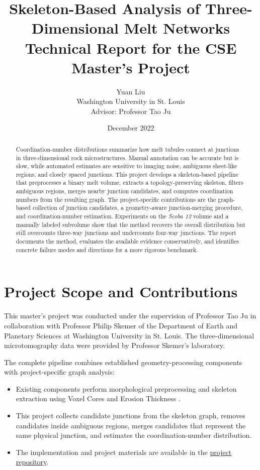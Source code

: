 \documentclass[11pt,letterpaper]{article}
\title{Skeleton-Based Analysis of Three-Dimensional Melt Networks\\
\large Technical Report for the CSE Master's Project}
\author{Yuan Liu\\
Washington University in St. Louis\\
Advisor: Professor Tao Ju}
\date{December 2022}
\newcommand{\dataset}{\textit{Scoba 12}}
\begin{document}
\maketitle

\begin{abstract}
Coordination-number distributions summarize how melt tubules connect at junctions in three-dimensional rock microstructures. Manual annotation can be accurate but is slow, while automated estimates are sensitive to imaging noise, ambiguous sheet-like regions, and closely spaced junctions. This project develops a skeleton-based pipeline that preprocesses a binary melt volume, extracts a topology-preserving skeleton, filters ambiguous regions, merges nearby junction candidates, and computes coordination numbers from the resulting graph. The project-specific contributions are the graph-based collection of junction candidates, a geometry-aware junction-merging procedure, and coordination-number estimation. Experiments on the \dataset{} volume and a manually labeled subvolume show that the method recovers the overall distribution but still overcounts three-way junctions and undercounts four-way junctions. The report documents the method, evaluates the available evidence conservatively, and identifies concrete failure modes and directions for a more rigorous benchmark.
\end{abstract}

\section{Project Scope and Contributions}

This master's project was conducted under the supervision of Professor Tao Ju in collaboration with Professor Philip Skemer of the Department of Earth and Planetary Sciences at Washington University in St. Louis. The three-dimensional microtomography data were provided by Professor Skemer's laboratory.

The complete pipeline combines established geometry-processing components with project-specific graph analysis:
\begin{itemize}
    \item Existing components perform morphological preprocessing and skeleton extraction using Voxel Cores and Erosion Thickness \cite{voxelcore,erosionthickness}.
    \item This project collects candidate junctions from the skeleton graph, removes candidates inside ambiguous regions, merges candidates that represent the same physical junction, and estimates the coordination-number distribution.
    \item The implementation and project materials are available in the \href{https://github.com/HiveYuan/Skeleton_Analysis_of_Melt_Network}{project repository}.
\end{itemize}
\end{document}
